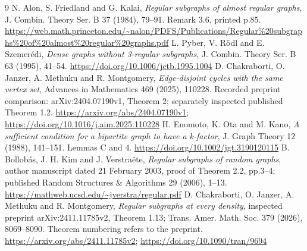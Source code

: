 \documentclass[11pt]{article}
\begin{document}
\begin{thebibliography}{9}
 N. Alon, S. Friedland and G. Kalai, \emph{Regular subgraphs of almost regular graphs}, J. Combin. Theory Ser. B 37 (1984), 79--91. Remark 3.6, printed p.85. \url{https://web.math.princeton.edu/~nalon/PDFS/Publications/Regular%20subgraphs%20of%20almost%20regular%20graphs.pdf}
 L. Pyber, V. R\"odl and E. Szemer\'edi, \emph{Dense graphs without 3-regular subgraphs}, J. Combin. Theory Ser. B 63 (1995), 41--54. \url{https://doi.org/10.1006/jctb.1995.1004}
 D. Chakraborti, O. Janzer, A. Methuku and R. Montgomery, \emph{Edge-disjoint cycles with the same vertex set}, Advances in Mathematics 469 (2025), 110228. Recorded preprint comparison: arXiv:2404.07190v1, Theorem 2; separately inspected published Theorem 1.2. \url{https://arxiv.org/abs/2404.07190v1}; \url{https://doi.org/10.1016/j.aim.2025.110228}
 H. Enomoto, K. Ota and M. Kano, \emph{A sufficient condition for a bipartite graph to have a k-factor}, J. Graph Theory 12 (1988), 141--151. Lemmas C and 4. \url{https://doi.org/10.1002/jgt.3190120115}
 B. Bollob\'as, J. H. Kim and J. Verstra\"ete, \emph{Regular subgraphs of random graphs}, author manuscript dated 21 February 2003, proof of Theorem 2.2, pp.3--4; published Random Structures \& Algorithms 29 (2006), 1--13. \url{https://mathweb.ucsd.edu/~jverstra/regular.pdf}
 D. Chakraborti, O. Janzer, A. Methuku and R. Montgomery, \emph{Regular subgraphs at every density}, inspected preprint arXiv:2411.11785v2, Theorem 1.13; Trans. Amer. Math. Soc. 379 (2026), 8069--8090. Theorem numbering refers to the preprint. \url{https://arxiv.org/abs/2411.11785v2}; \url{https://doi.org/10.1090/tran/9694}
\end{thebibliography}
\end{document}
